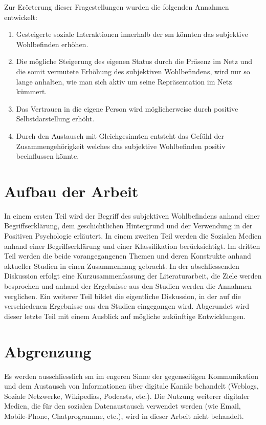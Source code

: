 Zur Erörterung dieser Fragestellungen wurden die folgenden Annahmen entwickelt:

\begin{enumerate}
\item Gesteigerte soziale Interaktionen innerhalb der \gls{sm} könnten das subjektive Wohlbefinden erhöhen.
\item Die mögliche Steigerung des eigenen Status durch die Präsenz im Netz und die somit vermutete Erhöhung des subjektiven Wohlbefindens, wird nur so lange anhalten, wie man sich aktiv um seine Repräsentation im Netz kümmert.
\item Das Vertrauen in die eigene Person wird möglicherweise durch positive Selbstdarstellung erhöht.
\item Durch den Austausch mit Gleichgesinnten entsteht das Gefühl der Zusammengehörigkeit welches das subjektive Wohlbefinden positiv beeinflussen könnte.
\end{enumerate}

\section{Aufbau der Arbeit}\label{sec.aufbau}
In einem ersten Teil wird der Begriff des subjektiven Wohlbefindens anhand einer Begriffserklärung, dem geschichtlichen Hintergrund und der Verwendung in der Positiven Psychologie erläutert. In einem zweiten Teil werden die Sozialen Medien anhand einer Begriffserklärung und einer Klassifikation berücksichtigt. Im dritten Teil werden die beide vorangegangenen Themen und deren Konstrukte anhand aktueller Studien in einen Zusammenhang gebracht. In der abschliessenden Diskussion erfolgt eine Kurzusammenfassung der Literaturarbeit, die Ziele werden besprochen und anhand der Ergebnisse aus den Studien werden die Annahmen verglichen. Ein weiterer Teil bildet die eigentliche Diskussion, in der auf die verschiedenen Ergebnisse aus den Studien eingegangen wird. Abgerundet wird dieser letzte Teil mit einem Ausblick auf mögliche zukünftige Entwicklungen.

\section{Abgrenzung}\label{sec.abgrenzung}
Es werden ausschliesslich \gls{sm} im engeren Sinne der gegenseitigen Kommunikation und dem Austausch von Informationen über digitale Kanäle behandelt (Weblogs, Soziale Netzwerke, Wikipedias, Podcasts, etc.). 
Die Nutzung weiterer digitaler Medien, die für den sozialen Datenaustausch verwendet werden (wie Email, Mobile-Phone, Chatprogramme, etc.), wird in dieser Arbeit nicht behandelt.

